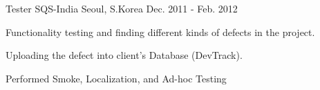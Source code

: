 \begin{cventries}
  \cventry
    {Tester} %
    {SQS-India } %
    {Seoul, S.Korea} %
    {Dec. 2011 - Feb. 2012} %
    {
      \begin{cvitems} %
        \item {Functionality testing and finding different kinds of defects in the project.}
        \item {Uploading the defect into client’s Database (DevTrack).}
        \item {Performed Smoke, Localization, and Ad-hoc Testing}
      \end{cvitems}
    }

\end{cventries}

